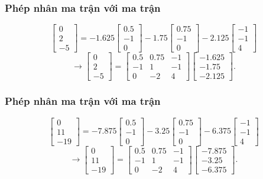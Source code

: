 \begin{frame}
    \frametitle{Phép nhân ma trận với ma trận}
    \[
    \begin{bmatrix}
    0\\2\\-5
\end{bmatrix}=-1.625\begin{bmatrix}
    0.5\\-1\\0
\end{bmatrix}-1.75\begin{bmatrix}
    0.75\\-1\\0
\end{bmatrix}-2.125\begin{bmatrix}
    -1\\-1\\4
\end{bmatrix}\]\[\rightarrow \begin{bmatrix}
    0\\2\\-5
\end{bmatrix}=\begin{bmatrix}
    0.5 & 0.75 & -1\\
    -1 & 1 & -1\\
    0 & -2 & 4
\end{bmatrix}\begin{bmatrix}
    -1.625\\-1.75\\-2.125
\end{bmatrix}.
\]
\end{frame}
\begin{frame}
    \frametitle{Phép nhân ma trận với ma trận}
    \[
    \begin{bmatrix}
    0\\11\\-19
\end{bmatrix}=-7.875\begin{bmatrix}
    0.5\\-1\\0
\end{bmatrix}-3.25\begin{bmatrix}
    0.75\\-1\\0
\end{bmatrix}-6.375\begin{bmatrix}
    -1\\-1\\4
\end{bmatrix}
    \]
    \[\rightarrow
    \begin{bmatrix}
    0\\11\\-19
\end{bmatrix}=\begin{bmatrix}
    0.5 & 0.75 & -1\\
    -1 & 1 & -1\\
    0 & -2 & 4
\end{bmatrix}\begin{bmatrix}
    -7.875\\-3.25\\-6.375
\end{bmatrix}.
    \]
\end{frame}
